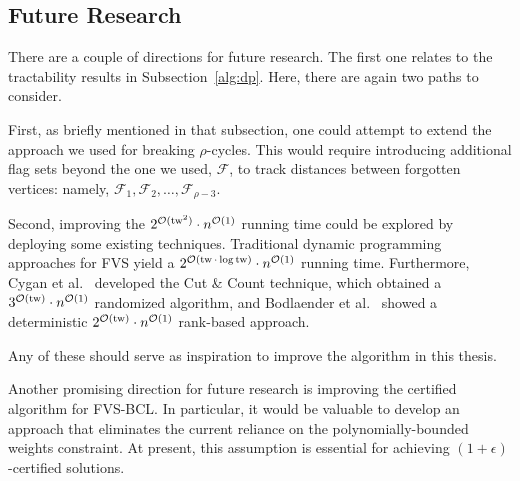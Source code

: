 \subsection*{Future Research}

There are a couple of directions for future research. The first one relates to the tractability 
results in Subsection~\ref{alg:dp}. Here, there are again two paths to consider.

First, as briefly mentioned in that subsection, one could attempt to extend the approach we used for 
breaking $\rho$-cycles. This would require introducing additional flag sets beyond the one we used, 
$\mathcal{F}$, to track distances between forgotten vertices: namely, 
$\mathcal{F}_1, \mathcal{F}_2, \dots, \mathcal{F}_{\rho-3}$.

Second, improving the $2^{\mathcal{O}(\operatorname{tw}^2)} \cdot n^{\mathcal{O}(1)}$ running time 
could be explored by deploying some existing techniques. Traditional dynamic programming 
approaches for FVS yield a $2^{\mathcal{O}(\operatorname{tw} \cdot \log \operatorname{tw})} \cdot n^{\mathcal{O}(1)}$ running time. 
Furthermore, Cygan et al.~\cite{cygan2022solving} developed the Cut \& Count technique, 
which obtained a $3^{\mathcal{O}(\operatorname{tw})} \cdot n^{\mathcal{O}(1)}$ randomized algorithm, and 
Bodlaender et al.~\cite{bodlaender2015deterministic} 
showed a deterministic $2^{\mathcal{O}(\operatorname{tw})} \cdot n^{\mathcal{O}(1)}$ rank-based approach.

Any of these should serve as inspiration to improve the algorithm in this thesis.

Another promising direction for future research is improving the certified algorithm for FVS-BCL. 
In particular, it would be valuable to develop an approach that eliminates the current reliance on 
the polynomially-bounded weights constraint. At present, this assumption is essential for 
achieving $(1 + \epsilon)$-certified solutions.
